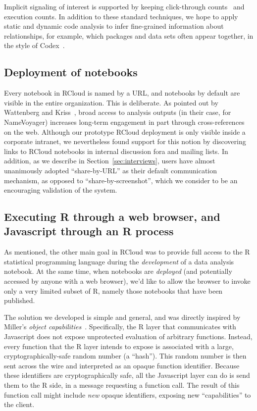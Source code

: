 Implicit signaling of interest is supported by keeping click-through
counts~\cite{Joachims:2005:AIC} and execution counts. In addition to
these standard techniques, we hope to apply static and dynamic code
analysis to infer fine-grained information about relationships,
for example, which packages and data sets often appear together,
in the style of Codex~\cite{Fast:2014:ECS}.

\subsection{Deployment of notebooks\label{sec:deployment}}

Every notebook in RCloud is named by a URL, and notebooks by default
are visible in the entire organization. This is deliberate.
As pointed out by Wattenberg and Kriss~\cite{Wattenberg:2011:DFS},
broad access to analysis outputs (in their case, for NameVoyager) increases
long-term engagement in part through cross-references on the
web. Although our prototype RCloud deployment is only visible inside a
corporate intranet, we nevertheless found support for this notion by
discovering links to RCloud notebooks in internal discussion fora and
mailing lists. In addition, as we describe in
Section~\ref{sec:interviews}, users have almost unanimously adopted
``share-by-URL'' as their default communication mechanism, as opposed
to ``share-by-screenshot'', which we consider to be an encouraging
validation of the system.

\subsection{Executing R through a web browser, and Javascript through an R process\label{sec:Rinbrowser}}

As mentioned, the other main goal in RCloud was to provide
full access to the R statistical programming language during the
\emph{development} of a data analysis notebook.
At the same time, when notebooks are \emph{deployed} (and potentially
accessed by anyone with a web browser), we'd like to allow the
browser to invoke only a very limited subset of R, namely those
notebooks that have been published.

The solution we developed is simple and general, and was directly
inspired by Miller's \emph{object
  capabilities}~\cite{Miller:2006:RCT}. Specifically, the R layer that
communicates with Javascript does not expose unprotected evaluation of
arbitrary functions. Instead, every function that the R layer intends
to expose is associated with a large, cryptographically-safe random
number (a ``hash''). This random number is then sent
across the wire and interpreted as an opaque function identifier.
Because these identifiers are cryptographically safe, all
the Javascript layer can do is send them to the R side, in a
message requesting a function call. 
The result of this function call might include \emph{new}
opaque identifiers, exposing new ``capabilities'' to the client.

